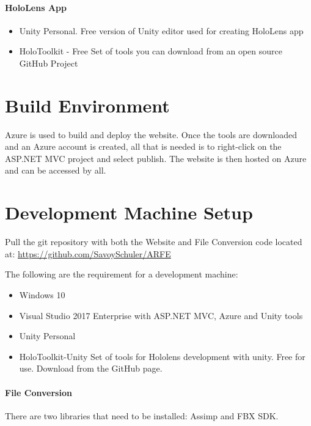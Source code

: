 \paragraph{HoloLens App}
\begin{itemize}
    \item Unity Personal. Free version of Unity editor used for creating HoloLens app

    \item HoloToolkit - Free Set of tools you can download from an open source GitHub Project
\end{itemize}

\section{Build  Environment}
Azure is used to build and deploy the website. Once the tools are downloaded and an Azure account is created, 
all that is needed is to right-click on the ASP.NET MVC project and select publish. The website is then hosted on Azure and
can be accessed by all.
\section{Development Machine Setup}

Pull the git repository with both the Website and File Conversion code located at: \url{https://github.com/SavoySchuler/ARFE}


The following are the requirement for a development machine:
\begin{itemize}
    \item Windows 10
    \item Visual Studio 2017 Enterprise with ASP.NET MVC, Azure and Unity tools
    \item Unity Personal
    \item HoloToolkit-Unity Set of tools for Hololens development with unity. Free for use. Download from the GitHub page.
\end{itemize}

\paragraph{File Conversion}

There are two libraries that need to be installed: Assimp and FBX SDK.

